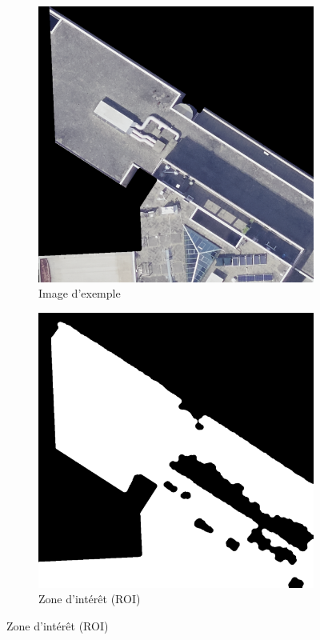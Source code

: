 \begin{figure}[H]
    \centering
    
    \begin{subfigure}[b]{0.48\textwidth}
        \centering
        \includegraphics[width=\textwidth]{02-main/figures/ch3/ch3_essai_sam_01_image_original.png}
        \caption{Image d'exemple}
        \label{fig:ch3_essai_sam_01_image_original}
    \end{subfigure}
    \hfill
    \begin{subfigure}[b]{0.48\textwidth}
        \centering
        \includegraphics[width=\textwidth]{02-main/figures/ch3/ch3_essai_sam_02_ROI.png}
        \caption{Zone d’intérêt (ROI)}
        \label{fig:ch3_essai_sam_02_ROI}
    \end{subfigure}
    

\end{figure}
